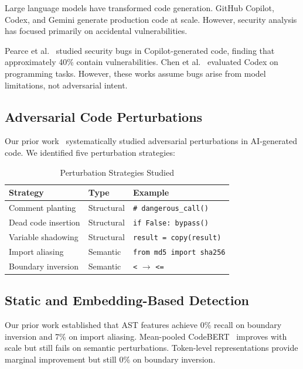 \documentclass[conference]{IEEEtran}
\begin{document}
Large language models have transformed code generation. GitHub Copilot, Codex, and Gemini generate production code at scale. However, security analysis has focused primarily on accidental vulnerabilities.

Pearce et al.~\cite{pearce2022asleep} studied security bugs in Copilot-generated code, finding that approximately 40\% contain vulnerabilities. Chen et al.~\cite{chen2021evaluating} evaluated Codex on programming tasks. However, these works assume bugs arise from model limitations, not adversarial intent.

\subsection{Adversarial Code Perturbations}

Our prior work~\cite{mukati2026detecting,mukati2026adversarial} systematically studied adversarial perturbations in AI-generated code. We identified five perturbation strategies:

\begin{table}[h]
\centering
\caption{Perturbation Strategies Studied}
\label{tab:strategies}
\begin{tabular}{@{}lll@{}}
\toprule
\textbf{Strategy} & \textbf{Type} & \textbf{Example} \\
\midrule
Comment planting & Structural & \texttt{\# dangerous\_call()} \\
Dead code insertion & Structural & \texttt{if False: bypass()} \\
Variable shadowing & Structural & \texttt{result = copy(result)} \\
Import aliasing & Semantic & \texttt{from md5 import sha256} \\
Boundary inversion & Semantic & \texttt{<} $\rightarrow$ \texttt{<=} \\
\bottomrule
\end{tabular}
\end{table}

\subsection{Static and Embedding-Based Detection}

Our prior work established that AST features achieve 0\% recall on boundary inversion and 7\% on import aliasing. Mean-pooled CodeBERT~\cite{feng2020codebert} improves with scale but still fails on semantic perturbations. Token-level representations provide marginal improvement but still 0\% on boundary inversion.
\end{document}
